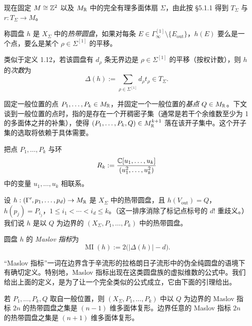 
现在固定 $M\cong\mathbb{Z}^2$ 以及 $M_{\mathbb{R}}$ 中的完全有理多面体扇 $\Sigma$，由此按 §5.1.1 得到 $T_\Sigma$ 与 $r:T_\Sigma\to M$。

\begin{definition}
称圆盘 $h$ 是 $X_\Sigma$ 中的\emph{热带圆盘}，如果对每条 $E\in\Gamma^{[1]}_{\infty}\setminus\{E_{\mathrm{out}}\}$，$h(E)$ 要么是一个点，要么是某个 $\rho\in\Sigma^{[1]}$ 的平移。
\end{definition}

类似于定义 1.12，若该圆盘有 $d_\rho$ 条无界边是 $\rho\in\Sigma^{[1]}$ 的平移（按权计数），则 $h$ 的\emph{次数}为
\[
  \Delta(h):=\sum_{\rho\in\Sigma^{[1]}}d_\rho t_\rho\in T_\Sigma.
\]

固定一般位置的点 $P_1,\ldots,P_k\in M_{\mathbb{R}}$，并固定一个一般位置的\emph{基点} $Q\in M_{\mathbb{R}}$。下文谈到一般位置的点时，指的是存在一个开稠密子集（通常是若干个余维数至少为 1 的多面体之并的补集），使得 $(P_1,\ldots,P_k,Q)\in M_{\mathbb{R}}^{k+1}$ 落在该开子集中。这个开子集的选取将依赖于具体需要。

把点 $P_1,\ldots,P_k$ 与环
\[
  R_k:=\frac{\mathbb{C}[u_1,\ldots,u_k]}{(u_1^2,\ldots,u_k^2)}
\]
中的变量 $u_1,\ldots,u_k$ 相联系。

\begin{definition}
设 $h:(\Gamma',p_1,\ldots,p_d)\to M_{\mathbb{R}}$ 是 $X_\Sigma$ 中的热带圆盘，且 $h(V_{\mathrm{out}})=Q$，$h(p_j)=P_{i_j}$，$1\le i_1<\cdots<i_d\le k$。（这一排序消除了标记点标号的 $d!$ 重歧义。）我们说 $h$ 是以 $Q$ 为边界的 $(X_\Sigma,P_1,\ldots,P_k)$ 中的热带圆盘。
\end{definition}

圆盘 $h$ 的 \emph{Maslov 指标}为
\[
  \operatorname{MI}(h):=2\bigl(|\Delta(h)|-d\bigr).
\]

“Maslov 指标”一词在边界含于辛流形的拉格朗日子流形中的伪全纯圆盘的语境下有确切定义。特别地，Maslov 指标出现在这类圆盘族的虚拟维数的公式中。我们给出上面的定义，是为了让一个完全类似的公式成立，它由下面的引理给出。

\begin{lemma}
若 $P_1,\ldots,P_k,Q$ 取自一般位置，则 $(X_\Sigma,P_1,\ldots,P_k)$ 中以 $Q$ 为边界的 Maslov 指标 $2n$ 的热带圆盘之集是 $(n-1)$ 维多面体复形。边界任意的 Maslov 指标 $2n$ 的热带圆盘之集是 $(n+1)$ 维多面体复形。
\end{lemma}


